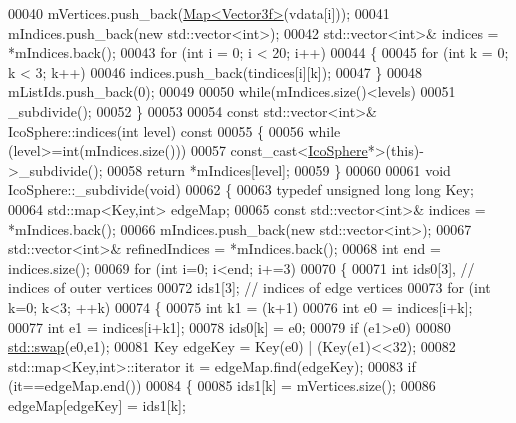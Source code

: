 \begin{DoxyCode}
00040     mVertices.push\_back(\hyperlink{group___core___module_class_eigen_1_1_map}{Map<Vector3f>}(vdata[i]));
00041   mIndices.push\_back(\textcolor{keyword}{new} std::vector<int>);
00042   std::vector<int>& indices = *mIndices.back();
00043   \textcolor{keywordflow}{for} (\textcolor{keywordtype}{int} i = 0; i < 20; i++)
00044   \{
00045     \textcolor{keywordflow}{for} (\textcolor{keywordtype}{int} k = 0; k < 3; k++)
00046       indices.push\_back(tindices[i][k]);
00047   \}
00048   mListIds.push\_back(0);
00049 
00050   \textcolor{keywordflow}{while}(mIndices.size()<levels)
00051     \_subdivide();
00052 \}
00053 
00054 \textcolor{keyword}{const} std::vector<int>& IcoSphere::indices(\textcolor{keywordtype}{int} level)\textcolor{keyword}{ const}
00055 \textcolor{keyword}{}\{
00056   \textcolor{keywordflow}{while} (level>=\textcolor{keywordtype}{int}(mIndices.size()))
00057     \textcolor{keyword}{const\_cast<}\hyperlink{class_ico_sphere}{IcoSphere}*\textcolor{keyword}{>}(\textcolor{keyword}{this})->\_subdivide();
00058   \textcolor{keywordflow}{return} *mIndices[level];
00059 \}
00060 
00061 \textcolor{keywordtype}{void} IcoSphere::\_subdivide(\textcolor{keywordtype}{void})
00062 \{
00063   \textcolor{keyword}{typedef} \textcolor{keywordtype}{unsigned} \textcolor{keywordtype}{long} \textcolor{keywordtype}{long} Key;
00064   std::map<Key,int> edgeMap;
00065   \textcolor{keyword}{const} std::vector<int>& indices = *mIndices.back();
00066   mIndices.push\_back(\textcolor{keyword}{new} std::vector<int>);
00067   std::vector<int>& refinedIndices = *mIndices.back();
00068   \textcolor{keywordtype}{int} end = indices.size();
00069   \textcolor{keywordflow}{for} (\textcolor{keywordtype}{int} i=0; i<end; i+=3)
00070   \{
00071     \textcolor{keywordtype}{int} ids0[3],  \textcolor{comment}{// indices of outer vertices}
00072         ids1[3];  \textcolor{comment}{// indices of edge vertices}
00073     \textcolor{keywordflow}{for} (\textcolor{keywordtype}{int} k=0; k<3; ++k)
00074     \{
00075       \textcolor{keywordtype}{int} k1 = (k+1)%
00076       \textcolor{keywordtype}{int} e0 = indices[i+k];
00077       \textcolor{keywordtype}{int} e1 = indices[i+k1];
00078       ids0[k] = e0;
00079       \textcolor{keywordflow}{if} (e1>e0)
00080         \hyperlink{endian_8c_a3ca5ecd34b04d6a243c054ac3a57f68d}{std::swap}(e0,e1);
00081       Key edgeKey = Key(e0) | (Key(e1)<<32);
00082       std::map<Key,int>::iterator it = edgeMap.find(edgeKey);
00083       \textcolor{keywordflow}{if} (it==edgeMap.end())
00084       \{
00085         ids1[k] = mVertices.size();
00086         edgeMap[edgeKey] = ids1[k];

\end{DoxyCode}
